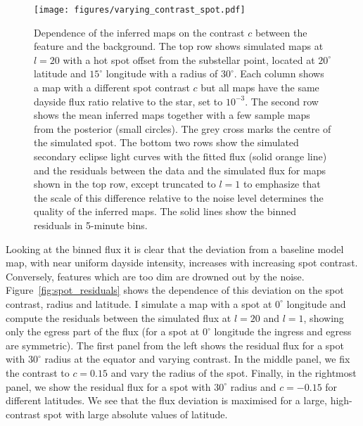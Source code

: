 \documentclass[12pt,dvipsnames]{report}
\begin{document}
\begin{figure}[t!]
    \begin{centering}
        \texttt{[image: figures/varying\_contrast\_spot.pdf]}
        \caption{
            Dependence of the inferred maps on the contrast $c$ between the feature and the background.
            The top row shows simulated maps at $l=20$ with a hot spot offset from the substellar point, located at
            $20^\circ$ latitude and $15^\circ$ longitude with a radius of $30^\circ$.
            Each column shows a map with a different spot contrast $c$ but all maps have the same dayside
            flux ratio relative to the star, set to $10^{-3}$.
            The second row shows the mean inferred maps together with a few sample maps from the posterior
            (small circles).
            The grey cross marks the centre of the simulated spot.
            The bottom two rows show the simulated secondary eclipse light curves with the fitted flux
            (solid orange line) and the residuals between the data and the simulated flux for maps
            shown in the top row, except truncated to $l=1$ to emphasize that the scale of this difference
            relative to the noise level determines the quality of the inferred maps.
            The solid lines show the binned residuals in 5-minute bins.
        }
        \label{fig:varying_contrast_spot}
    \end{centering}
\end{figure}

Looking at the binned flux it is clear that the deviation from a baseline model map,
with near uniform dayside intensity, increases with increasing spot contrast.
Conversely, features which are too dim are drowned out by the noise. 
Figure~\ref{fig:spot_residuals} shows the dependence of this deviation on the
spot contrast, radius and latitude. I simulate a map with a spot at $0^\circ$
longitude and compute the residuals between the simulated flux at $l=20$ and
$l=1$, showing only the egress part of the flux (for a spot at $0^\circ$
longitude the ingress and egress are symmetric). The first panel from the left
shows the residual flux for a spot with $30^\circ$ radius at the equator and 
varying contrast. In the middle panel, we fix the contrast to $c=0.15$ and vary
the radius of the spot. Finally, in the rightmost panel, we show the residual
flux for a spot with $30^\circ$ radius and $c=-0.15$ for different latitudes. We
see that the flux deviation is maximised for a large, high-contrast spot
with large absolute values of latitude.
\end{document}
